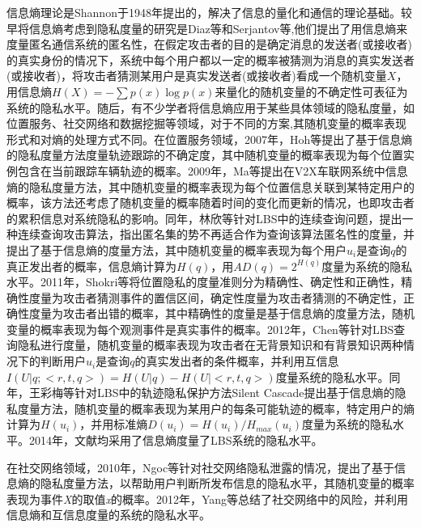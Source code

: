 信息熵理论是Shannon于1948年提出的，解决了信息的量化和通信的理论基础。较早将信息熵考虑到隐私度量的研究是Diaz等\cite{diaz2002towards}和Serjantov等\cite{serjantov2002towards},他们提出了用信息熵来度量匿名通信系统的匿名性，在假定攻击者的目的是确定消息的发送者(或接收者)的真实身份的情况下，系统中每个用户都以一定的概率被猜测为消息的真实发送者(或接收者)，将攻击者猜测某用户是真实发送者(或接收者)看成一个随机变量$X$，用信息熵$H(X)=-\sum p(x)\log p(x)$来量化的随机变量的不确定性可表征为系统的隐私水平。随后，有不少学者将信息熵应用于某些具体领域的隐私度量，如位置服务、社交网络和数据挖掘等领域，对于不同的方案\cite{serjantov2002towards,shokri2011quantifying,wang2012location},其随机变量的概率表现形式和对熵的处理方式不同。在位置服务领域，2007年，Hoh等\cite{hoh2007preserving}提出了基于信息熵的隐私度量方法度量轨迹跟踪的不确定度，其中随机变量的概率表现为每个位置实例包含在当前跟踪车辆轨迹的概率。2009年，Ma等\cite{ma2009measuring}提出在V2X车联网系统中信息熵的隐私度量方法，其中随机变量的概率表现为每个位置信息关联到某特定用户的概率，该方法还考虑了随机变量的概率随着时间的变化而更新的情况，也即攻击者的累积信息对系统隐私的影响。同年，林欣等\cite{lin2009lbs}针对LBS中的连续查询问题，提出一种连续查询攻击算法，指出匿名集的势不再适合作为查询该算法匿名性的度量，并提出了基于信息熵的度量方法，其中随机变量的概率表现为每个用户$u_{i}$是查询$q$的真正发出者的概率，信息熵计算为$H(q)$，用$AD(q)=2^{H(q)}$度量为系统的隐私水平。2011年，Shokri等\cite{shokri2011quantifying}将位置隐私的度量准则分为精确性、确定性和正确性，精确性度量为攻击者猜测事件的置信区间，确定性度量为攻击者猜测的不确定性，正确性度量为攻击者出错的概率，其中精确性的度量是基于信息熵的度量方法，随机变量的概率表现为每个观测事件是真实事件的概率。2012年，Chen等\cite{chen2012measuring}针对LBS查询隐私进行度量，随机变量的概率表现为攻击者在无背景知识和有背景知识两种情况下的判断用户$u_{i}$是查询$q$的真实发出者的条件概率，并利用互信息$I(U|q;<r,t,q>)=H(U|q)-H(U|<r,t,q>)$度量系统的隐私水平。同年，王彩梅\cite{wang2012location}等针对LBS中的轨迹隐私保护方法Silent Cascade提出基于信息熵的隐私度量方法，随机变量的概率表现为某用户的每条可能轨迹的概率，特定用户的熵计算为$H(u_{i})$，并用标准熵$D(u_{i})=H(u_{i})/H_{max}(u_{i})$度量为系统的隐私水平。2014年，文献\cite{niu2014achieving,olteanu2017quantifying}均采用了信息熵度量了LBS系统的隐私水平。

在社交网络领域，2010年，Ngoc等\cite{ngoc2010new}针对社交网络隐私泄露的情况，提出了基于信息熵的隐私度量方法，以帮助用户判断所发布信息的隐私水平，其随机变量的概率表现为事件\textit{X}的取值\textit{x}的概率。2012年，Yang等\cite{yang2012stalking}总结了社交网络中的风险，并利用信息熵和互信息度量的系统的隐私水平。


